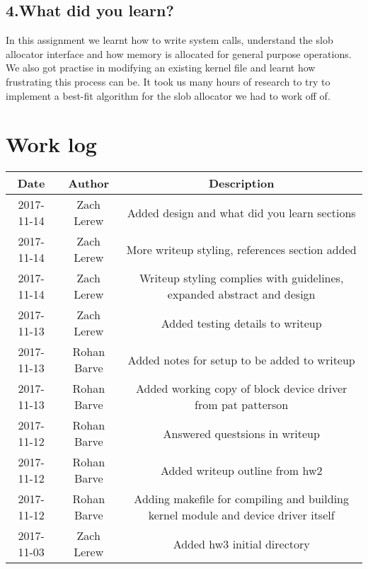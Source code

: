\documentclass[onecolumn, draftclsnofoot,10pt, compsoc]{IEEEtran}
\begin{document}
	\subsection*{4.What did you learn?}
  In this assignment we learnt how to write system calls, understand the slob allocator interface and how memory is allocated for general purpose operations. We also got practise in modifying an existing kernel file and learnt how frustrating this process can be. It took us many hours of research to try to implement a best-fit algorithm for the slob allocator  we had to work off of. 


	\section*{Work log}
  	\begin{center}
    	\begin{tabular}{ |c|c|c| }
    		\hline
    		Date & Author & Description \\
    		\hline
        2017-11-14 & Zach Lerew & Added design and what did you learn sections \\
        2017-11-14 & Zach Lerew & More writeup styling, references section added \\
        2017-11-14 & Zach Lerew & Writeup styling complies with guidelines, expanded abstract and design \\
        2017-11-13 & Zach Lerew & Added testing details to writeup \\
        2017-11-13 & Rohan Barve & Added notes for setup to be added to writeup \\
        2017-11-13 & Rohan Barve & Added working copy of block device driver from pat patterson \\
        2017-11-12 & Rohan Barve & Answered questsions in writeup \\
        2017-11-12 & Rohan Barve & Added writeup outline from hw2 \\
        2017-11-12 & Rohan Barve & Adding makefile for compiling and building kernel module and device driver itself \\
        2017-11-03 & Zach Lerew & Added hw3 initial directory \\
    		\hline
    	\end{tabular}
  	\end{center}


  
  
\end{document}
